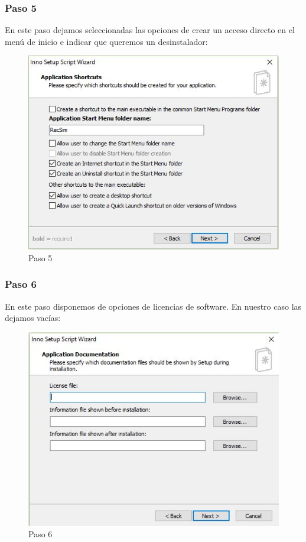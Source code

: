 \newpage

\subsubsection{Paso 5}

En este paso dejamos seleccionadas las opciones de crear un acceso directo en el menú de inicio e indicar que queremos un desinstalador:

\begin{figure}[H]
	\centering\includegraphics[scale=0.5]{imagenes/implementacion/5.jpg}
	\caption{Paso 5}
	\label{instaladorPaso5}
\end{figure}

\subsubsection{Paso 6}

En este paso disponemos de opciones de licencias de software. En nuestro caso las dejamos vacías:

\begin{figure}[H]
	\centering\includegraphics[scale=0.5]{imagenes/implementacion/6.jpg}
	\caption{Paso 6}
	\label{instaladorPaso6}
\end{figure}

